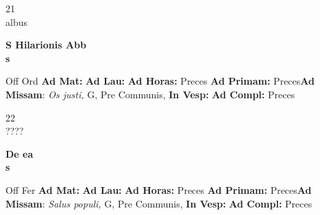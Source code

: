\documentclass[10pt, openany]{book}
\begin{document}
    \begin{center}
        \begin{minipage}{3.5in}
            \vspace{2em}
            \begin{minipage}{0.5in}
                {\Huge 21} \\
                {\normalsize albus}
            \end{minipage}
            \begin{minipage}{3.0in}
                \textbf{ \large S Hilarionis Abb \\
                \textnormal{\normalsize s}}

            \end{minipage}
            \begin{justify}Off Ord
                \textbf{Ad Mat: }
                \textbf{Ad Lau: }
                \textbf{Ad Horas: }Preces
                \textbf{Ad Primam: }Preces\textbf{Ad Missam}: \textit{Os justi,} G, Pre Communis, 
                \textbf{In Vesp: }
                \textbf{Ad Compl: }Preces
            \end{justify}
        \end{minipage}
    \end{center}

    \begin{center}
        \begin{minipage}{3.5in}
            \vspace{2em}
            \begin{minipage}{0.5in}
                {\Huge 22} \\
                {\normalsize ????}
            \end{minipage}
            \begin{minipage}{3.0in}
                \textbf{ \large De ea \\
                \textnormal{\normalsize s}}

            \end{minipage}
            \begin{justify}Off Fer
                \textbf{Ad Mat: }
                \textbf{Ad Lau: }
                \textbf{Ad Horas: }Preces
                \textbf{Ad Primam: }Preces\textbf{Ad Missam}: \textit{Salus populi,} G, Pre Communis, 
                \textbf{In Vesp: }
                \textbf{Ad Compl: }Preces
            \end{justify}
        \end{minipage}
    \end{center}
\end{document}
